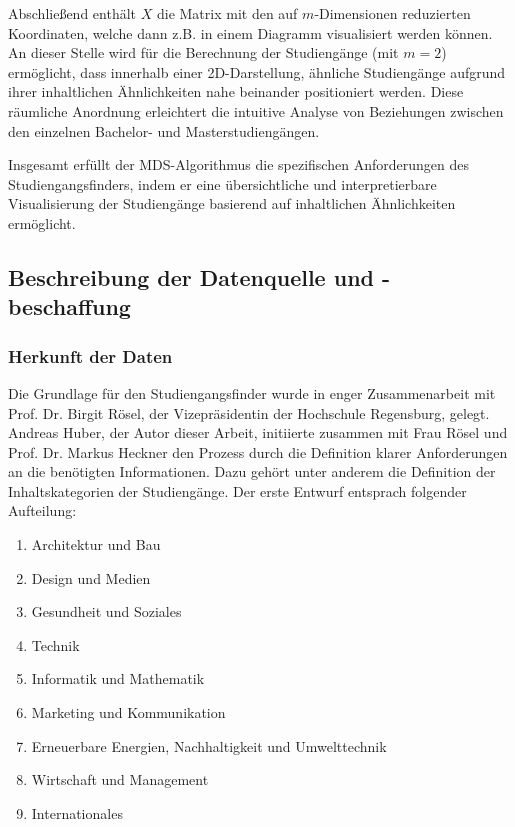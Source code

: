 Abschließend enthält $ X $ die Matrix mit den auf $ m $-Dimensionen reduzierten
Koordinaten, welche dann z.B. in einem Diagramm visualisiert werden können.
An dieser Stelle wird für die Berechnung der Studiengänge (mit $ m = 2 $)
ermöglicht, dass innerhalb einer 2D-Darstellung, ähnliche Studiengänge aufgrund
ihrer inhaltlichen Ähnlichkeiten nahe beinander positioniert werden. Diese
räumliche Anordnung erleichtert die intuitive Analyse von Beziehungen zwischen
den einzelnen Bachelor- und Masterstudiengängen.

Insgesamt erfüllt der MDS-Algorithmus die spezifischen Anforderungen des
Studiengangsfinders, indem er eine übersichtliche und interpretierbare
Visualisierung der Studiengänge basierend auf inhaltlichen Ähnlichkeiten
ermöglicht.

\subsection{Beschreibung der Datenquelle und -beschaffung}
\subsubsection{Herkunft der Daten}\label{sec:herkunft-der-daten}
Die Grundlage für den Studiengangsfinder wurde in enger Zusammenarbeit mit Prof. Dr. Birgit Rösel, der Vizepräsidentin der Hochschule Regensburg, gelegt. Andreas Huber, der Autor dieser Arbeit, initiierte zusammen mit Frau Rösel und Prof. Dr. Markus Heckner den Prozess durch die Definition klarer Anforderungen an die benötigten Informationen. Dazu gehört unter anderem die Definition der Inhaltskategorien der Studiengänge. Der erste Entwurf entsprach folgender Aufteilung:

\begin{enumerate}
    \item Architektur und Bau
    \item Design und Medien
    \item Gesundheit und Soziales
    \item Technik
    \item Informatik und Mathematik
    \item Marketing und Kommunikation
    \item Erneuerbare Energien, Nachhaltigkeit und Umwelttechnik
    \item Wirtschaft und Management
    \item Internationales
\end{enumerate}

